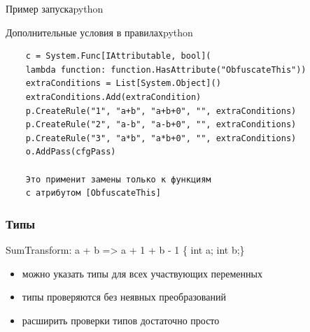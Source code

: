 \documentclass[10pt]{beamer}
\begin{document}

\begin{frame}{Пример запуска}{python}
\lstI
\end{frame}

\begin{frame}[fragile]{Дополнительные условия в правилах}{python}
\begin{verbatim}
    c = System.Func[IAttributable, bool](
    lambda function: function.HasAttribute("ObfuscateThis"))
    extraConditions = List[System.Object]()
    extraConditions.Add(extraCondition)
    p.CreateRule("1", "a+b", "a+b+0", "", extraConditions)
    p.CreateRule("2", "a-b", "a-b+0", "", extraConditions)
    p.CreateRule("3", "a*b", "a*b+0", "", extraConditions)
    o.AddPass(cfgPass)
    
    Это применит замены только к функциям 
    с атрибутом [ObfuscateThis]
\end{verbatim}
\end{frame}



\begin{frame}
\frametitle{Типы}
\begin{tcolorbox}[colback=green!5,colframe=green!40!black,title=пример]
SumTransform: a + b => a + 1 + b - 1  \{ int a; int b;\}
\end{tcolorbox}
\begin{itemize}
  \item можно указать типы для всех участвующих переменных
  \item типы проверяются без неявных преобразований
  \item расширить проверки типов достаточно просто
\end{itemize}
\end{frame}
\end{document}
